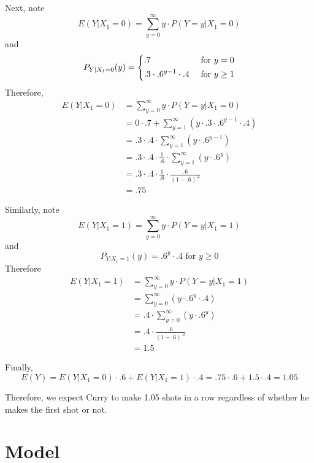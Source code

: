 \documentclass[paper=a4, fontsize=11pt]{scrartcl} %
\numberwithin{equation}{section} %
\numberwithin{figure}{section} %
\numberwithin{table}{section} %
\begin{document}
Next, note
\begin{equation*}
E(Y | X_1 = 0) = \sum_{y = 0}^\infty y \cdot P(Y = y | X_1 = 0)
\end{equation*}
and
\[
P_{Y | X_1 = 0}(y) = 
\begin{dcases}
   .7 & \textrm{  for } y =0\\
   .3 \cdot .6^{y-1} \cdot .4 & \textrm{  for } y \geq 1\\
\end{dcases}
\]
Therefore, 
\begin{align*}
E(Y | X_1 = 0) &= \sum_{y = 0}^\infty y \cdot P(Y = y | X_1 = 0)\\
   &= 0 \cdot .7 + \sum_{y = 1}^\infty (y \cdot .3 \cdot .6^{y-1} \cdot .4)\\
   &= .3 \cdot .4 \cdot \sum_{y = 1}^\infty (y \cdot .6^{y-1})\\
   &= .3 \cdot .4 \cdot \frac{1}{.6} \cdot \sum_{y = 1}^\infty (y \cdot .6^{y})\\
   &= .3 \cdot .4 \cdot \frac{1}{.6} \cdot \frac{.6}{(1-.6)^{.2}}\\
   &= .75
\end{align*}

Similarly, note
\begin{equation*}
E(Y | X_1 = 1) = \sum_{y = 0}^\infty y \cdot P(Y = y | X_1 = 1)
\end{equation*}
and
\[
P_{Y | X_1 = 1}(y) = .6^y \cdot .4 \textrm{  for } y \geq 0
\]
Therefore
\begin{align*}
E(Y | X_1 = 1) &= \sum_{y = 0}^\infty y \cdot P(Y = y | X_1 = 1)\\
   &=  \sum_{y = 0}^\infty (y \cdot .6^{y} \cdot .4)\\
   &= .4 \cdot \sum_{y = 0}^\infty (y \cdot .6^{y})\\
   &= .4 \cdot \frac{.6}{(1-.6)^{.2}}\\
   &= 1.5
\end{align*}

Finally,
\[
E(Y) = E(Y | X_1 = 0) \cdot .6 + E(Y | X_1 = 1) \cdot .4 = .75 \cdot .6 + 1.5 \cdot .4 = 1.05
\]

Therefore, we expect Curry to make 1.05 shots in a row regardless of whether he makes the first shot or not.


\section{Model}
\end{document}
